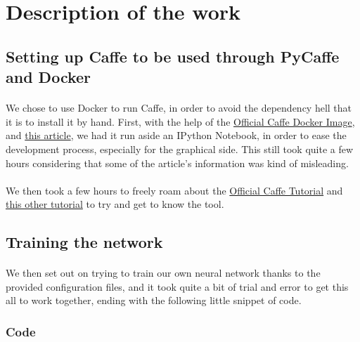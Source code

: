 \documentclass[french]{article}
\begin{document}
\newpage

\section{Description of the work}

\subsection{Setting up Caffe to be used through PyCaffe and Docker}

\paragraph{} We chose to use Docker to run Caffe, in order to avoid the dependency hell that it is to install it by hand. First, with the help of the \href{https://github.com/BVLC/caffe/tree/master/docker
}{Official Caffe Docker Image}, and \href{https://towardsdatascience.com/playing-with-caffe-and-docker-to-build-deep-learning-models-99c9570ffc3d}{this article}, we had it run aside an IPython Notebook, in order to ease the development process, especially for the graphical side. This still took quite a few hours considering that some of the article's information was kind of misleading.

\paragraph{} We then took a few hours to freely roam about the \href{http://caffe.berkeleyvision.org/tutorial/}{Official Caffe Tutorial} and \href{http://christopher5106.github.io/deep/learning/2015/09/04/Deep-learning-tutorial-on-Caffe-Technology.html}{this other tutorial} to try and get to know the tool.

\subsection{Training the network}

\paragraph{} We then set out on trying to train our own neural network thanks to the provided configuration files, and it took quite a bit of trial and error to get this all to work together, ending with the following little snippet of code.

\subsubsection{Code}
\end{document}
